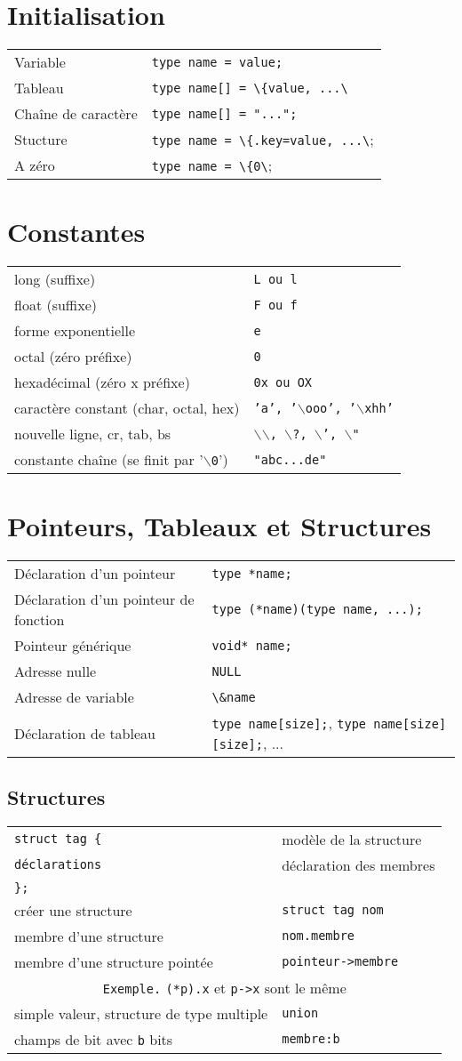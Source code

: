 \documentclass{article}
\newcommand{\key}[2]{#1 &\texttt{#2} \\ }
\newcommand{\keyg}[2]{\texttt{#2}&#1\\}
\newcommand{\exemple}[1]{\multicolumn{2}{c}{\texttt{Exemple.} #1}\\}
\newcommand{\bs}{$\backslash$}
\newcommand{\tab}{\hspace{2em}}
\newenvironment{keylist}
     {\noindent\begin{tabular*}{\linewidth}{ll}} %
     {\end{tabular*}}
\newcommand{\cd}{\lstinline}
\begin{document}
\begin{multicols*}{3}
\section*{Initialisation}
\begin{tabularx}{\linewidth}{Xl}
  Variable & \cd{type name = value;} \\
  Tableau & \cd{type name[] = \{value, ...\}}; \\
  Chaîne de caractère & \cd{type name[] = "...";} \\
  Stucture & \cd{type name = \{.key=value, ...\};} \\
  A zéro & \cd{type name = \{0\};} \\
\end{tabularx}

\section*{Constantes}
\begin{keylist}
\key{long (suffixe)}{L \textrm{ou} l}
\key{float (suffixe)}{F \textrm{ou} f}
\key{forme exponentielle}{e}
\key{octal (zéro préfixe)}{0}
\key{hexadécimal (zéro x préfixe)}{0x \textrm{ou} OX}
\key{caractère constant (char, octal, hex)}{'a', '\bs\texttt{ooo}', '\bs{}x\texttt{hh}'}
\key{nouvelle ligne, cr, tab, bs}{\bs\bs{}, \bs?, \bs', \bs"}
\key{constante chaîne (se finit par '\texttt{\bs{}0}')}{"abc...de"}
\end{keylist}

\section*{Pointeurs, Tableaux et Structures}
\begin{tabularx}{\linewidth}{Xl}
  Déclaration d'un pointeur & \cd{type *name;} \\
  Déclaration d'un pointeur de fonction & \cd{type (*name)(type name, ...);} \\
  Pointeur générique & \cd{void* name;} \\
  Adresse nulle & \cd{NULL} \\
  Adresse de variable & \cd{\&name} \\
  Déclaration de tableau & \cd{type name[size];}, \cd{type name[size][size];}, ... \\
\end{tabularx}

\subsection*{Structures}
\begin{keylist}
\keyg{modèle de la structure}{struct \texttt{tag} \{}
\keyg{déclaration des membres}{\tab\texttt{déclarations}}
\keyg{}{\};}
\key{créer une structure}{struct \texttt{tag} \texttt{nom}}
\key{membre d'une structure}{\texttt{nom}.\texttt{membre}}
\key{membre d'une structure pointée}{\texttt{pointeur}->\texttt{membre}}
\exemple{\texttt{(*p).x} et \texttt{p->x} sont le même}
\key{simple valeur, structure de type multiple}{union}
\key{champs de bit avec \texttt{b} bits}{\texttt{membre}:\texttt{b}}
\end{keylist}


\end{multicols*}
\end{document}
